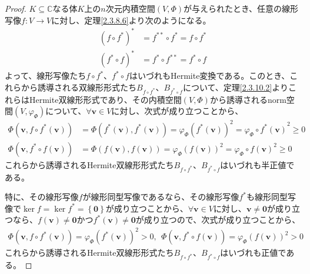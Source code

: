 \documentclass[dvipdfmx]{jsarticle}
\begin{document}
\begin{proof}
$K \subseteq \mathbb{C}$なる体$K$上の$n$次元内積空間$(V,\varPhi)$が与えられたとき、任意の線形写像$f:V \rightarrow V$に対し、定理\ref{2.3.8.6}より次のようになる。
\begin{align*}
\left( f \circ f^{*} \right)^{*} &= f^{**} \circ f^{*} = f \circ f^{*}\\
\left( f^{*} \circ f \right)^{*} &= f^{*} \circ f^{**} = f^{*} \circ f
\end{align*}
よって、線形写像たち$f \circ f^{*}$、$f^{*} \circ f$はいづれもHermite変換である。このとき、これらから誘導される双線形形式たち$B_{f \circ f^{*}}$、$B_{f^{*} \circ f}$について、定理\ref{2.3.10.2}よりこれらはHermite双線形形式であり、その内積空間$(V,\varPhi)$から誘導されるnorm空間$\left( V,\varphi_{\varPhi} \right)$について、$\forall\mathbf{v} \in V$に対し、次式が成り立つことから、
\begin{align*}
\varPhi\left( \mathbf{v},f \circ f^{*}\left( \mathbf{v} \right) \right) &= \varPhi\left( f^{*}\left( \mathbf{v} \right),f^{*}\left( \mathbf{v} \right) \right) = {\varphi_{\varPhi}\left( f^{*}\left( \mathbf{v} \right) \right)}^{2} = {\varphi_{\varPhi} \circ f^{*}\left( \mathbf{v} \right)}^{2} \geq 0\\
\varPhi\left( \mathbf{v},f^{*} \circ f\left( \mathbf{v} \right) \right) &= \varPhi\left( f\left( \mathbf{v} \right),f\left( \mathbf{v} \right) \right) = {\varphi_{\varPhi}\left( f\left( \mathbf{v} \right) \right)}^{2} = {\varphi_{\varPhi} \circ f\left( \mathbf{v} \right)}^{2} \geq 0
\end{align*}
これらから誘導されるHermite双線形形式たち$B_{f \circ f^{*}}$、$B_{f^{*} \circ f}$はいづれも半正値である。\par
特に、その線形写像$f$が線形同型写像であるなら、その線形写像$f^{*}$も線形同型写像で$\ker f = \ker f^{*} = \left\{ \mathbf{0} \right\}$が成り立つことから、$\forall\mathbf{v} \in V$に対し、$\mathbf{v} \neq \mathbf{0}$が成り立つなら、$f\left( \mathbf{v} \right) \neq \mathbf{0}$かつ$f^{*}\left( \mathbf{v} \right) \neq \mathbf{0}$が成り立つので、次式が成り立つことから、
\begin{align*}
\varPhi\left( \mathbf{v},f \circ f^{*}\left( \mathbf{v} \right) \right) = {\varphi_{\varPhi}\left( f^{*}\left( \mathbf{v} \right) \right)}^{2} > 0,\ \ \varPhi\left( \mathbf{v},f^{*} \circ f\left( \mathbf{v} \right) \right) = {\varphi_{\varPhi}\left( f\left( \mathbf{v} \right) \right)}^{2} > 0
\end{align*}
これらから誘導されるHermite双線形形式たち$B_{f \circ f^{*}}$、$B_{f^{*} \circ f}$はいづれも正値である。
\end{proof}
\end{document}
